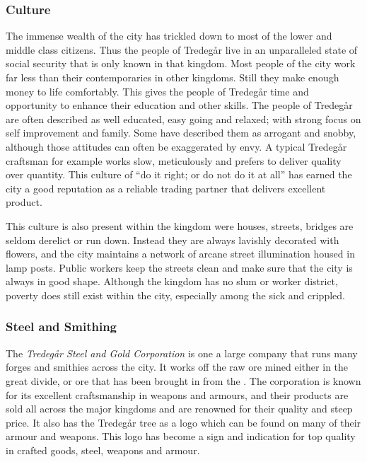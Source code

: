 \subsubsection{Culture}

The immense wealth of the city has trickled down to most of the lower and middle
class citizens. Thus the people of Tredegår live in an unparalleled state of
social security that is only known in that kingdom. Most people of the city
work far less than their contemporaries in other kingdoms. Still they make
enough money to life comfortably. This gives the people of Tredegår time and
opportunity to enhance their education and other skills. The people of Tredegår
are often described as well educated, easy going and relaxed; with strong focus
on self improvement and family. Some have described them as arrogant and snobby,
although those attitudes can often be exaggerated by envy. A typical Tredegår
craftsman for example works slow, meticulously and prefers to deliver quality
over quantity. This culture of ``do it right; or do not do it at all'' has
earned the city a good reputation as a reliable trading partner that delivers
excellent product.

This culture is also present within the kingdom were houses, streets, bridges
are seldom derelict or run down. Instead they are always lavishly decorated with
flowers, and the city maintains a network of arcane street illumination housed
in lamp posts. Public workers keep the streets clean and make sure that the
city is always in good shape. Although the kingdom has no slum or worker
district, poverty does still exist within the city, especially among the sick
and crippled.

\subsubsection{Steel and Smithing}

The \emph{Tredegår Steel and Gold Corporation} is one a large company that
runs many forges and smithies across the city. It works off the raw ore mined
either in the great divide, or ore that has been brought in from the
. The corporation is known for its excellent
craftsmanship in weapons and armours, and their products are sold all across
the major kingdoms and are renowned for their quality and steep price. It also
has the Tredegår tree as a logo which can be found on many of their armour
and weapons. This logo has become a sign and indication for top quality in
crafted goods, steel, weapons and armour.

